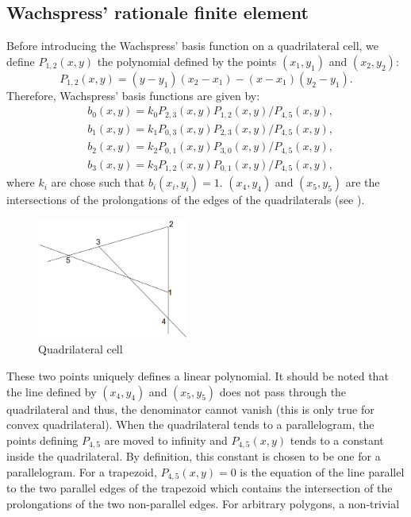 \subsection{Wachspress' rationale finite element}
Before introducing the Wachspress' basis function on a quadrilateral cell, 
we define $P_{1,2}(x,y)$ the polynomial defined by the points $(x_1,y_1)$ and
$(x_2,y_2)$:
\begin{equation}
  P_{1,2}(x,y) = (y-y_1) (x_2-x_1)-(x-x_1)(y_2-y_1).
\end{equation}  
Therefore, Wachspress' basis functions are given by:
\begin{align}
  &b_0(x,y) = k_0 P_{2,3}(x,y)P_{1,2}(x,y)/P_{4,5}(x,y),\\
  &b_1(x,y) = k_1 P_{0,3}(x,y)P_{2,3}(x,y)/P_{4,5}(x,y),\\
  &b_2(x,y) = k_2 P_{0,1}(x,y)P_{3,0}(x,y)/P_{4,5}(x,y),\\
  &b_3(x,y) = k_3 P_{1,2}(x,y)P_{0,1}(x,y)/P_{4,5}(x,y),
\end{align}
where $k_i$ are chose such that $b_i(x_i,y_i)=1$. $(x_4,y_4)$ and $(x_5,y_5)$
are the intersections of the prolongations of the edges 
of the quadrilaterals (see ).
\begin{figure}[H]
  \centering
  \includegraphics[width=5cm]{quadrilateral}
  \caption{Quadrilateral cell}
  \label{fig_quadrilateral}
\end{figure}
These two points uniquely defines a linear polynomial. It should be noted that 
the line defined by $(x_4,y_4)$ and $(x_5,y_5)$ does not pass through the 
quadrilateral and thus, the denominator cannot vanish (this is 
only true for convex quadrilateral). When the quadrilateral tends to a 
parallelogram, the points defining $P_{4,5}$ are moved to infinity and 
$P_{4,5}(x,y)$ tends to a constant inside the quadrilateral. By definition, 
this constant is chosen to be one for a parallelogram. For a trapezoid,
$P_{4,5}(x,y)=0$ is the equation of the line parallel to the two parallel
edges of the trapezoid which contains the intersection of the prolongations of
the two non-parallel edges. For arbitrary polygons, a non-trivial 

